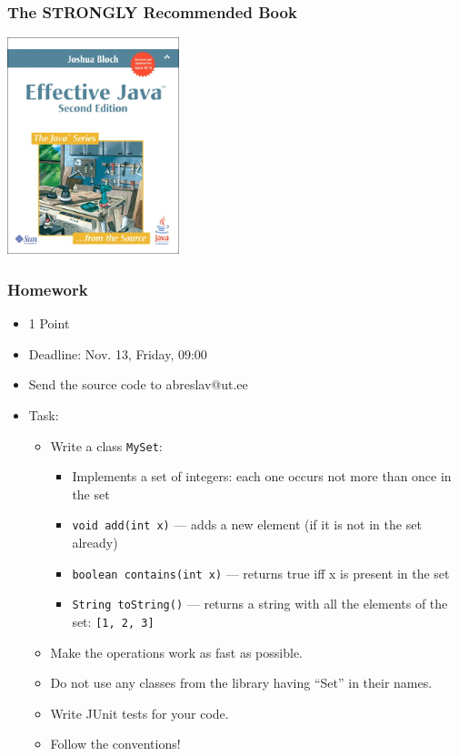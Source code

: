 \documentclass[screen]{beamer}
\begin{document}
\begin{frame}[fragile]
\frametitle{The STRONGLY Recommended Book}
\begin{center}
\includegraphics[width=5cm,height=6.3cm]{EJCover.png}
\end{center}
\end{frame}

\begin{frame}[fragile]
\frametitle{Homework}

\begin{itemize}[<+->]
	\item 1 Point
	\item Deadline: Nov. 13, Friday, 09:00
	\item Send the source code to
		abreslav@ut.ee
	\item Task:\\
		\begin{itemize}
		\item Write a class \texttt{MySet}:
		\begin{itemize}
			\item Implements a set of integers: each one occurs not more than once in the set
			\item \lstinline!void add(int x)! --- adds a new element (if it is not in the set already)
			\item \lstinline!boolean contains(int x)! --- returns true iff x is present in the set
			\item \lstinline!String toString()! --- returns a string with all the elements of the set:
				\texttt{[1, 2, 3]}
		\end{itemize}
		\item Make the operations work as fast as possible.
		\item Do not use any classes from the library having ``Set'' in their names.
		\item Write JUnit tests for your code.
		\item \alert{Follow the conventions!}
		\end{itemize}
\end{itemize}

\end{frame}
\end{document}
